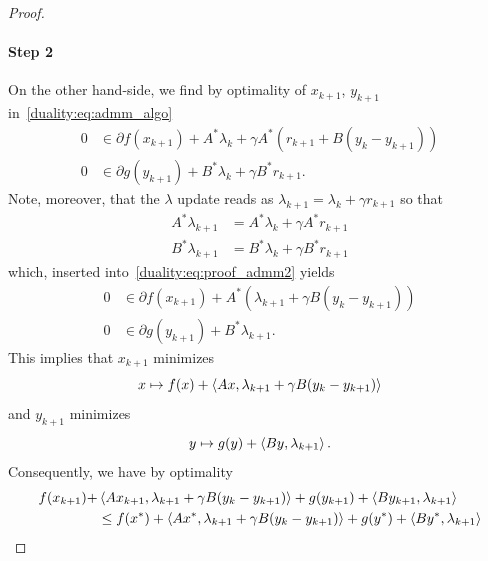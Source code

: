 \begin{proof}
    \paragraph{Step 2}
    On the other hand-side, we find by optimality of $x_{k+1}$, $y_{k+1}$ in~\eqref{duality:eq:admm_algo}
    \begin{equation}\label{duality:eq:proof_admm2}
        \begin{aligned}
            0 &\in \partial f(x_{k+1}) + A^*\lambda_k + \gamma A^*(r_{k+1} + B(y_k-y_{k+1}))\\
            0 &\in \partial g(y_{k+1}) + B^*\lambda_k + \gamma B^*r_{k+1}.
        \end{aligned}
    \end{equation}
    Note, moreover, that the $\lambda$ update reads as $\lambda_{k+1} = \lambda_k + \gamma r_{k+1}$ so that
    \begin{equation}
        \begin{aligned}
            A^* \lambda_{k+1} &= A^*\lambda_k + \gamma A^*r_{k+1}\\
            B^* \lambda_{k+1} &= B^*\lambda_k + \gamma B^*r_{k+1}
        \end{aligned}
    \end{equation}
    which, inserted into~\eqref{duality:eq:proof_admm2} yields
    \begin{equation}
        \begin{aligned}
            0 &\in \partial f(x_{k+1}) + A^*(\lambda_{k+1} + \gamma B(y_k-y_{k+1}))\\
            0 &\in \partial g(y_{k+1}) + B^*\lambda_{k+1}.
        \end{aligned}
    \end{equation}
    This implies that $x_{k+1}$ minimizes
    \begin{equation}
        x\mapsto f(x) + \left\langle A x , \lambda_{k+1} + \gamma B(y_k-y_{k+1})\right\rangle
    \end{equation}
    and $y_{k+1}$ minimizes
    \begin{equation}
        y\mapsto g(y) + \left\langle By , \lambda_{k+1}\right\rangle.
    \end{equation}
    Consequently, we have by optimality
    \begin{equation}
        \begin{aligned}
            f(x_{k+1}) + &\inner{A x_{k+1}}{\lambda_{k+1} + \gamma B(y_k-y_{k+1})} + g(y_{k+1}) + \inner{By_{k+1}}{\lambda_{k+1}}\\
            &\leq
            f(x^*) + \inner{Ax^*}{\lambda_{k+1} + \gamma B(y_k-y_{k+1})} + g(y^*) + \inner{By^*}{\lambda_{k+1}}

\end{aligned}
\end{equation}
\end{proof}
